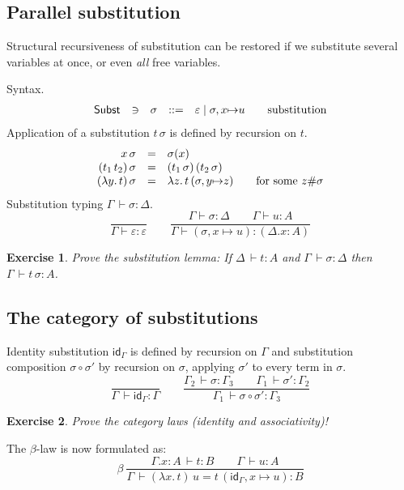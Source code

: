 \documentclass[a4paper,fleqn]{scrartcl}
\newtheorem{exercise}{Exercise}
\newcommand{\tid}{\mathsf{id}}
\newcommand{\comp}{\circ}
\newcommand{\der}{\,\vdash}
\newcommand{\ru}[2]{\dfrac{#1}{#2}}
\newcommand{\nru}[3]{#1\ \ru{#2}{#3}}
\newcommand{\Subst}{\mathsf{Subst}}
\newcommand{\GD}{\ensuremath{\Delta}}
\newcommand{\Ge}{\ensuremath{\varepsilon}}
\newcommand{\Gs}{\ensuremath{\sigma}}
\begin{document}
\subsection{Parallel substitution}

Structural recursiveness of substitution can be restored if we substitute several variables at once, or even \emph{all} free variables.

\noindent
Syntax.
\[
\begin{array}{lllrl@{\qquad}l}
\Subst & \ni & \sigma & ::= & \varepsilon \mid \sigma,x{\mapsto}u
  & \mbox{substitution} \\
\end{array}
\]
Application of a substitution $t\,\sigma$ is defined by recursion on $t$.
\[
\begin{array}{rll@{\qquad}l}
  x\,\sigma & = & \sigma(x) \\
  (t_1\,t_2)\,\sigma & = & (t_1\,\sigma)\,(t_2\,\sigma) \\
  (\lambda y.\,t)\,\sigma & = & \lambda z.\,t\,(\sigma, y{\mapsto}z)
    & \mbox{for some } z \# \sigma \\
\end{array}
\]
Substitution typing $\Gamma \der \sigma : \Delta$.
\[
  \ru{}{\Gamma \vdash \Ge : \Ge}
\qquad
  \ru{\Gamma \vdash \Gs : \GD \qquad \Gamma \vdash u : A
     }{\Gamma \vdash (\Gs,x{\mapsto}u) : (\GD.x{:}A)
     }
\]
\begin{exercise}
Prove the substitution lemma:
If $\Delta \der t : A$ and $\Gamma \der \Gs : \Delta$
then $\Gamma \der t\,\Gs : A$.
\end{exercise}


\subsection{The category of substitutions}

Identity substitution $\tid_\Gamma$ is defined by recursion on $\Gamma$ and substitution composition $\sigma\comp\sigma'$ by recursion on $\sigma$, applying $\sigma'$ to every term in $\sigma$.
\[
  \ru{}{\Gamma \der \tid_\Gamma : \Gamma}
  \qquad
  \ru{\Gamma_2 \der \sigma : \Gamma_3 \qquad
      \Gamma_1 \der \sigma' : \Gamma_2
    }{\Gamma_1 \der \sigma\comp\sigma' : \Gamma_3}
\]
\begin{exercise}
Prove the category laws (identity and associativity)!
\end{exercise}


The $\beta$-law is now formulated as:
\[
  \nru{\beta
    }{\Gamma.x{:}A \der t : B \qquad \Gamma \der u : A
    }{\Gamma \der (\lambda x.\,t)\,u = t\,(\tid_\Gamma,x{\mapsto}u) : B
    }
\]
\end{document}
